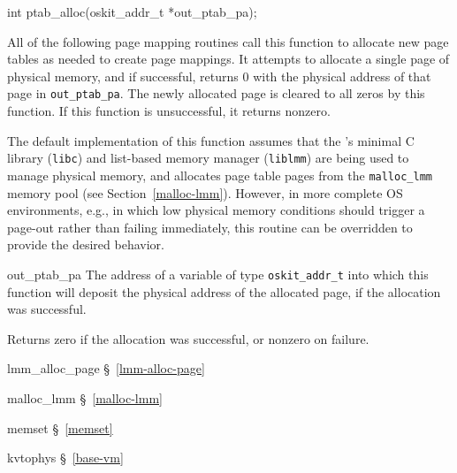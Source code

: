 \label{ptab-alloc}
\begin{apisyn}

	\funcproto int ptab_alloc(\outparam oskit_addr_t *out_ptab_pa);
\end{apisyn}
\begin{apidesc}
	All of the following page mapping routines
	call this function to allocate new page tables
	as needed to create page mappings.
	It attempts to allocate a single page of physical memory,
	and if successful,
	returns 0 with the physical address of that page in {\tt *out_ptab_pa}.
	The newly allocated page is cleared to all zeros by this function.
	If this function is unsuccessful, it returns nonzero.

	The default implementation of this function
	assumes that the \oskit{}'s minimal C library ({\tt libc})
	and list-based memory manager ({\tt liblmm}) are being used
	to manage physical memory,
	and allocates page table pages from the {\tt malloc_lmm} memory pool
	(see Section~\ref{malloc-lmm}).
	However, in more complete OS environments,
	e.g., in which low physical memory conditions
	should trigger a page-out rather than failing immediately,
	this routine can be overridden to provide the desired behavior.
\end{apidesc}
\begin{apiparm}
	\item[out_ptab_pa]
		The address of a variable of type {\tt oskit_addr_t}
		into which this function will deposit
		the physical address of the allocated page,
		if the allocation was successful.
\end{apiparm}
\begin{apiret}
	Returns zero if the allocation was successful,
	or nonzero on failure.
\end{apiret}
\begin{apidep}
	\item[lmm_alloc_page]	\S~\ref{lmm-alloc-page}
	\item[malloc_lmm]	\S~\ref{malloc-lmm}
	\item[memset]		\S~\ref{memset}
	\item[kvtophys]		\S~\ref{base-vm}
\end{apidep}

